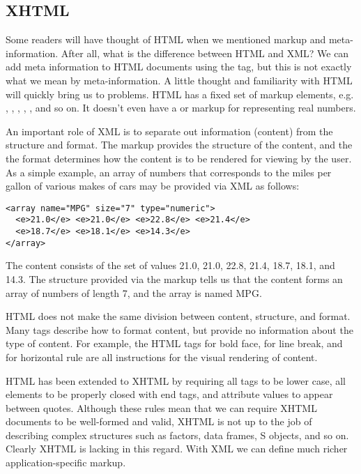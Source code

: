 \subsection{XHTML}
Some readers will have thought of HTML when we mentioned markup
and meta-information. 
After all, what is the difference between HTML and XML?
We can add meta information to HTML documents using the  tag, 
but this is not exactly what we mean by meta-information.  
A little thought and familiarity with HTML will quickly bring us to problems. 
HTML has a fixed set of markup elements, e.g. , , 
, , , and so on.  It doesn't even have a
 or  markup for representing real
numbers. 

An important role of XML is to
separate out information (content) from the structure and format.
The markup provides the structure of the content, and the
the format determines how the content is to be rendered for
viewing by the user. 
As a simple example, an array of numbers that corresponds to the
miles per gallon of various makes of cars may be provided
via XML as follows:
\begin{verbatim}
<array name="MPG" size="7" type="numeric">
  <e>21.0</e> <e>21.0</e> <e>22.8</e> <e>21.4</e>
  <e>18.7</e> <e>18.1</e> <e>14.3</e>
</array>
\end{verbatim}
The content consists of the set of values 
21.0, 21.0, 22.8, 21.4, 18.7, 18.1, and 14.3. 
The structure provided via the markup tells us that the content 
forms an array of numbers of length 7, and the array is named MPG.

HTML does not make the same division between content, structure, and format. 
Many tags describe how to format content, but provide no information about the
type of content.
For example, the HTML tags  for bold face,  
for line break, and  for horizontal rule are all
instructions for the visual rendering of content.  

HTML has been extended to XHTML by requiring all tags to be lower case, 
all elements to be properly closed with end tags, and attribute values
to appear between quotes. 
Although these rules mean that we can require XHTML documents to be well-formed and 
valid, XHTML is not up to the job of describing 
complex structures such as factors, data frames, S objects, and so on.
Clearly XHTML is lacking in this regard. 
With XML we can define much richer application-specific markup. 



